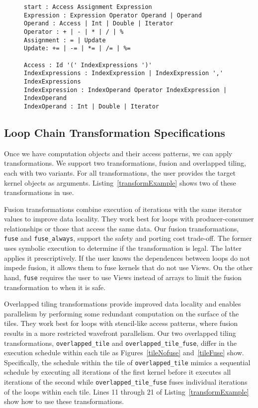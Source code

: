 \begin{figure}[t]
\begin{lstlisting}[label={ExpressionGrammar},caption={EBNF Grammar to Support Symbolic Evaluation}]
start : Access Assignment Expression
Expression : Expression Operator Operand | Operand
Operand : Access | Int | Double | Iterator
Operator : + | - | * | / | %
Assignment : = | Update
Update: += | -= | *= | /= | %=

Access : Id '(' IndexExpressions ')'
IndexExpressions : IndexExpression | IndexExpression ',' IndexExpressions
IndexExpression : IndexOperand Operator IndexExpression | IndexOperand
IndexOperand : Int | Double | Iterator
\end{lstlisting}
\end{figure}



\subsection{Loop Chain Transformation Specifications}
\label{sec:transspec}

Once we have computation objects and their
access patterns, we can apply transformations.
We support two transformations, fusion and overlapped tiling,
each with two variants.
For all transformations, the user provides the target kernel
objects as arguments.
Listing~\ref{transformExample} shows two of these transformations in use.

Fusion transformations combine execution of iterations with the same iterator
values to improve data locality.
They work best for loops with producer-consumer relationships or those that
access the same data.
Our fusion transformations, \verb.fuse. and \verb.fuse_always., support
the safety and porting cost trade-off. 
The former uses symbolic execution to determine if the transformation is legal.
The latter applies it prescriptively.
If the user knows the dependences between loops do not impede fusion,
it allows them to fuse kernels that do not use Views. 
On the other hand, \verb.fuse. requires the user to use Views instead
of arrays to limit the fusion transformation to when it is safe.

Overlapped tiling transformations provide improved data locality
and enables parallelism by performing some redundant computation 
on the surface of the tiles.
They work best for loops with stencil-like access patterns,
where fusion results in a more restricted wavefront parallelism.
Our two overlapped tiling transformations, \verb.overlapped_tile. and
\verb.overlapped_tile_fuse., differ in the execution schedule within each tile
as Figures~\ref{tileNofuse} and~\ref{tileFuse} show.
Specifically, the schedule within the tile of \verb.overlapped_tile. mimics
a sequential schedule by executing all iterations of the first kernel before
it executes all iterations of the second while \verb.overlapped_tile_fuse.
fuses individual iterations of the loops within each tile.
Lines 11 through 21 of Listing~\ref{transformExample} show how to use these transformations.

